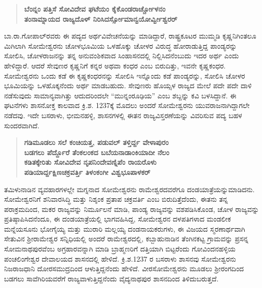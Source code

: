 \newpage

\begin{verse}
\textbf{ಬೆಂನ್ನಂ ಪತ್ತಿಸೆ ಸೋವಿದೇವ ಘಟೆಯಂ ಕೈಕೊಂಡರಾರ್ಚ್ಚೋಳನಂ} \\
\textbf{ತಂನಾಮ್ನಾಯದ ರಾಜ್ಯದೊಳ್​ ನಿರಿಸಿದರ್ಸ್ಸೋಮಾನ್ವಯೋರ್ವ್ವೀಶ್ವರರ್​}
\end{verse}

ಬಾ.ರಾ.ಗೋಪಾಲ್​ರವರು ಈ ಪದ್ಯದ ಅರ್ಥವಿವೇಚನೆಯನ್ನು ಮಾಡಿದ್ದಾರೆ, ರಾಷ್ಟ್ರಕೂಟರ ಮುಮ್ಮಡಿ ಕೃಷ್ಣ\-ನಿಗಿಂತಲೂ ಮಿಗಿಲಾಗಿ ಸೋಮೇಶ್ವರನು ಚೋಳಭೂಮಿಯ ಒಳಹೊಕ್ಕು ಚೋಳರ ವಿರುದ್ಧ ಹೋರಾಡುತ್ತಿದ್ದ ಪಾಂಡ್ಯರನ್ನು ಸೋಲಿಸಿ, ಚೋಳರಾಜನನ್ನು ತನ್ನ ಅನುವಂಶಿಕವಾದ ಸಿಂಹಾಸನದಲ್ಲಿ ನಿಲ್ಲಿಸಿದನೆಂಬುದು ಇದರ ಅರ್ಥ ಎಂದು ಹೇಳಿದ್ದಾರೆ. ಆದರೆ ಸೇವುಣರ ಕೃಷ್ಣನಿಗೆ ಕನ್ನರ ಅಥವಾ ಕಂಧರ ಎಂಬ ಬಿರುದಿತ್ತು, ಇವನೇ ಕೃಷ್ಣಕಂಧರ. ಸೋಮೇಶ್ವರನು ಒಂದು ಕಡೆ ಈ ಕೃಷ್ಣಕಂಧರನನ್ನು ಸೋಲಿಸಿ ಇನ್ನೊಂದು ಕಡೆ ಪಾಂಡ್ಯರನ್ನು, ಸೋಲಿಸಿ ಚೋಳರ ಭೂಮಿಯನ್ನು ಒಳಹೊಕ್ಕನೆಂದು ಅರ್ಥ ಮಾಡಬಹುದು. ಸೇವುಣರು ಹೊಯ್ಸಳ ರಾಜ್ಯದ ಮೇಲೆ ಪದೇ ಪದೇ ದಾಳಿ ನಡೆಸುವುದು ಸಾಮಾನ್ಯವಾಗಿತ್ತು ಆದುದರಿಂದಲೇ “ಮುನ್ನಂರೂಢಿಯ” ಎಂಬ ಶಬ್ದನ್ನು ಕವಿ ಬಳಸಿದ್ದಾನೆ. ಈ ಘಟನೆಗಳು ಶಾಸನೋಕ್ತ ಕಾಲವಾದ ಕ್ರಿ.ಶ. 1237ಕ್ಕೆ ಮೊದಲು ಅಂದರೆ ಸೋಮೇಶ್ವರನು ಯುವರಾಜನಾಗಿದ್ದಾಗಲೇ ನಡೆದವು. ಇದೇ ಬಸರಾಳು, ಭೀಮನಹಳ್ಳಿ, ಶಾಸನಗಳಲ್ಲಿ ಈತನ ರಾಜ್ಯವಿಸ್ತರಣೆಯನ್ನು ವಿವರಿಸುವ ಪದ್ಯ ಬಹಳ ಸುಂದರವಾಗಿದೆ.

\begin{verse}
\textbf{ಗಡಿಮೂಡಲು ಸಲೆ ಕಂಚಿಯತ್ತ, ಪಡುವಲ್​ ತಳ್ತಿರ್ದ್ದ ವೇಳಾಪುರಂ} \\\textbf{ಬಡಗಲು ಪೆರ್ದ್ದೊರೆ ತೆಂಕಲಂಕದ ಬಬೆಯನಾಡಾಂಕಿಯಾದೀ ನೆಲಂ} \\\textbf{ಕಡಿತಕ್ಕೇರಿತು ಸೋವಿದೇವ ನೃಪನಿಂದೇವಣ್ನಿಪೆಂ ರಾಯರೊಳು} \\\textbf{ಪಡಿಯಾರ್ದ್ದಕ್ಷಿಣಚಕ್ರವರ್ತ್ತಿ ತಿಳಂಕಂಗೀ ವಿಶ್ವಭೂಪಾಳಕರ್​}
\end{verse}

ತಮಿಳುನಾಡಿನ ವ್ಯವಹಾರಗಳಲ್ಲೇ ಮಗ್ನನಾದ ಸೋಮೇಶ್ವರನು ರಾಮೇಶ್ವರದವರೆಗೂ ದಂಡಯಾತ್ರೆಯನ್ನು\break ಮಾಡಿದನು. ಸೋಮೇಶ್ವರನಿಗೆ ಶನಿವಾರಸಿದ್ಧಿ ಮತ್ತು ನಿಶ್ಶಂಕ ಪ್ರತಾಪ ಚಕ್ರವರ್ತಿ ಎಂಬ ಬಿರುದಿತ್ತೆದೆಂದು, ಈತನು ತನ್ನ ಪರಾಕ್ರಮದಿಂದ, ಮಕರ ರಾಜ್ಯವನ್ನು ನಿರ್ಮೂಲನೆ ಮಾಡಿ, ಪಾಂಡ್ಯ ರಾಜ್ಯವನ್ನು ವಶಪಡಿಸಿಕೊಂಡ, ಚೋಳ ರಾಜ್ಯವನ್ನು ಪ್ರತಿಷ್ಠಾಪಿಸಿದನೆಂದೂ, ಈ ದಂಡಯಾತ್ರೆಯಲ್ಲಿ ಭಾಗವಹಿಸಿದ್ದ, ಸೋಮೇಶ್ವರನ ದಳಪತಿಗಳಾದ ಮಂಡಲೀಕ ಮನ್ನೆಯಸೂನು ಭೋಗೈಯ್ಯ ಮತ್ತು ಮುರಾರಿ ಮಲ್ಲಯ್ಯ ದಂಡನಾಯಕರುಗಳು, ಈ ವಿಜಯದ ಸ್ಮರಣಾರ್ಥವಾಗಿ ಸೇತುವಿನ ಶ‍್ರೀರಾಮೇಶ್ವರ ಸನ್ನಿಧಿಯಲ್ಲಿ ಅಂದರೆ ರಾಮೇಶ್ವರದಲ್ಲಿ, ಕಬ್ಬಾಹುನಾಡಿನ ತೆಂಗಿನಕಟ್ಟ ಗ್ರಾಮವನ್ನು ಪ್ರಸನ್ನ ಸೋಮನಾಥಪುರವೆಂಬ ಅಗ್ರಹಾರವನ್ನಾಗಿ ಮಾಡಿ ಬ್ರಾಹ್ಮಣರಿಗೆ ದತ್ತಿಯಾಗಿ ಬಿಟ್ಟರೆಂದು ಗೋವಿಂದನಹಳ್ಳಿಯ ಪಂಚಲಿಂಗೇಶ್ವರ ದೇವಾಲಯದ ಶಾಸನದಲ್ಲಿ ಹೇಳಿದೆ. ಕ್ರಿ.ಶ.1237 ರ ಬಸರಾಳು ಶಾಸನವು ಸೋಮೇಶ್ವರನು ನಿಜರಾಜಧಾನಿ ದೋರಸಮುದ್ರ\-ದಿಂದ ಆಳುತ್ತಿದ್ದನೆಂದು ಹೇಳಿದೆ. ವೀರಸೋಮೇಶ್ವರನು ಮೂಡಲು ಶ‍್ರೀರಂಗದಿಂದ ಬಡಗಲು ಸಾವೆಗಿರಿಯವರೆಗೆ ರಾಜ್ಯವಾಳುತ್ತಿದ್ದನೆಂದು ವೈದ್ಯನಾಥಪುರ ಶಾಸನದಿಂದ ತಿಳಿದುಬರುತ್ತದೆ.


